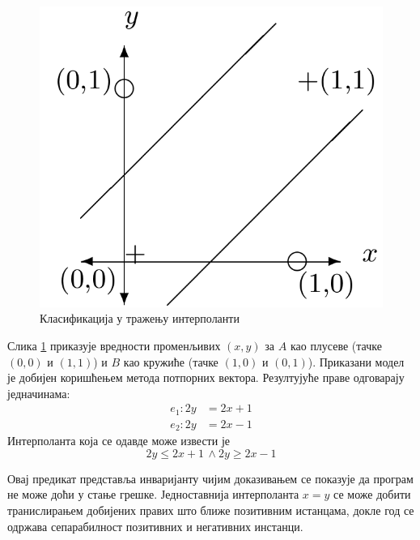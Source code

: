 \documentclass[a4paper]{article}
\begin{document}
{\begin{figure}[h!]
\begin{center}
\includegraphics[scale=0.15]{./slike/interpolant.png}
\end{center}
\caption{Класификација у тражењу интерполанти}
\label{fig:interpolant_svm}
\end{figure}

Слика \ref{fig:interpolant_svm} приказује вредности променљивих $(x, y)$ за $A$ као плусеве (тачке $(0, 0)$ и $(1, 1)$)
и $B$ као кружиће (тачке $(1, 0)$ и $(0, 1)$). Приказани модел је добијен коришћењем метода потпорних вектора. Резултујуће праве одговарају једначинама:
\begin{equation*}
\begin{split}
    e_1: 2y &= 2x + 1 \\
    e_2: 2y &= 2x - 1
\end{split}
\end{equation*}
Интерполанта која се одавде може извести је
\begin{equation*}
2y \leq 2x + 1 \, \land 2y \geq 2x - 1
\end{equation*}

Овај предикат представља инваријанту чијим доказивањем се показује да програм не може доћи у стање грешке.
Једноставнија интерполанта $x = y$ се може добити транислирањем добијених правих што ближе позитивним истанцама,
докле год се одржава сепарабилност позитивних и негативних инстанци.

}
\end{document}
